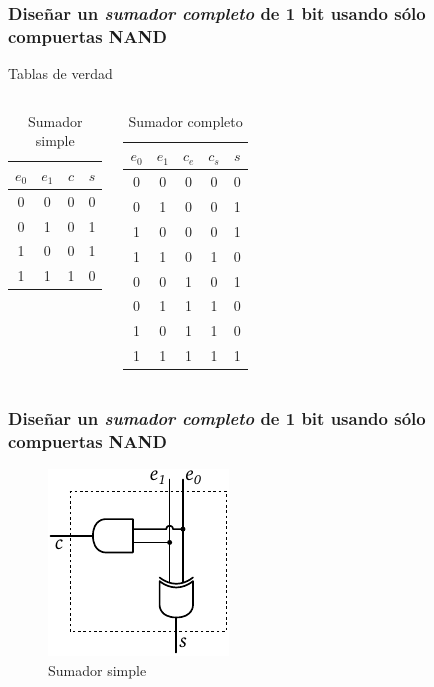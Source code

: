 \documentclass[mathserif,hyperref]{beamer}
\begin{document}
\begin{frame}
\frametitle{\small Diseñar un \textit{sumador completo} de 1 bit usando sólo
compuertas NAND}
Tablas de verdad
\begin{columns}
    \pause
    \begin{center}\begin{table}
    \begin{tabular}{| c | c || c | c |}
      \hline
      $e_0$ & $e_1$ & $c$ & $s$ \\ \hline
        0   &   0   &  0  &  0  \\
        0   &   1   &  0  &  1  \\
        1   &   0   &  0  &  1  \\
        1   &   1   &  1  &  0  \\
      \hline
    \end{tabular}
    \caption*{Sumador simple}
    \end{table}\end{center}
    \pause
    \begin{center}\begin{table}
    \begin{tabular}{| c | c | c || c | c |}
      \hline
      $e_0$ & $e_1$ & $c_e$ & $c_s$ & $s$ \\ \hline
        0   &   0   &   0   &   0   &  0  \\
        0   &   1   &   0   &   0   &  1  \\
        1   &   0   &   0   &   0   &  1  \\
        1   &   1   &   0   &   1   &  0  \\
        0   &   0   &   1   &   0   &  1  \\
        0   &   1   &   1   &   1   &  0  \\
        1   &   0   &   1   &   1   &  0  \\
        1   &   1   &   1   &   1   &  1  \\
      \hline
    \end{tabular}
    \caption*{Sumador completo}
    \end{table}\end{center}
\end{columns}
\end{frame}


\begin{frame}
\frametitle{\small Diseñar un \textit{sumador completo} de 1 bit usando sólo
compuertas NAND}
\begin{figure}[htp]
  \caption{Sumador simple}
  \includegraphics[scale=0.9]{sumador-simple.pdf}
\end{figure}
\end{frame}
\end{document}
